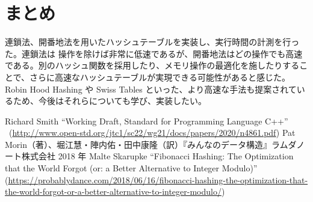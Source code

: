 \documentclass[dvipdfmx,a4j,10pt]{jarticle}
\begin{document}
\section{まとめ}

連鎖法、開番地法を用いたハッシュテーブルを実装し、実行時間の計測を行った。連鎖法は  操作を除けば非常に低速であるが、開番地法はどの操作でも高速である。別のハッシュ関数を採用したり、メモリ操作の最適化を施したりすることで、さらに高速なハッシュテーブルが実現できる可能性があると感じた。Robin Hood Hashing や Swiss Tables といった、より高速な手法も提案されているため、今後はそれらについても学び、実装したい。

\begin{thebibliography}{9}
   Richard Smith ``Working Draft, Standard for Programming Language C++''  \\ (\url{http://www.open-std.org/jtc1/sc22/wg21/docs/papers/2020/n4861.pdf})
   Pat Morin（著）、堀江慧・陣内佑・田中康隆（訳）『みんなのデータ構造』ラムダノート株式会社 2018 年
   Malte Skarupke ``Fibonacci Hashing: The Optimization that the World Forgot (or: a Better Alternative to Integer Modulo)'' \\ (\url{https://probablydance.com/2018/06/16/fibonacci-hashing-the-optimization-that-the-world-forgot-or-a-better-alternative-to-integer-modulo/})
\end{thebibliography}
\end{document}
